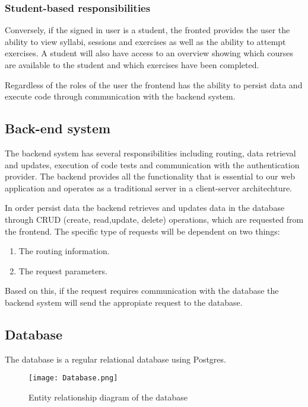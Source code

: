 \subsubsection*{Student-based responsibilities}
Conversely, if the signed in user is a student, the fronted provides the user the ability to view syllabi, sessions and exercises as well as the ability to attempt exercises. A student will also have access to an overview showing which courses are available to the student and which exercises have been completed. 

\vspace{0.5cm}

Regardless of the roles of the user the frontend has the ability to persist data and execute code through communication with the backend system.

\subsection{Back-end system}
The backend system has several responsibilities including routing, data retrieval and updates, execution of code tests and communication with the authentication provider. The backend provides all the functionality that is essential to our web application and operates as a traditional server in a client-server architechture. 

In order persist data the backend retrieves and updates data in the database through CRUD (create, read,update, delete) operations, which are requested from the frontend. The specific type of requests will be dependent on two things:
\begin{enumerate}
	\item The routing information.
	\item The request parameters.
\end{enumerate}

Based on this, if the request requires communication with the database the backend system will send the appropiate request to the database.

\subsection{Database}
The database is a regular relational database using Postgres. 

\begin{figure}[H]
	\texttt{[image: Database.png]}
	\centering
	\caption{Entity relationship diagram of the database}
	\label{fig:Database}
\end{figure}

